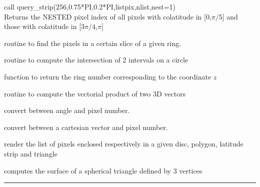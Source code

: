 \begin{example}
{
call query\_strip(256,0.75*PI,0.2*PI,listpix,nlist,nest=1)  \\
}
{
Returns the NESTED pixel index of all pixels with colatitude in
[0,$\pi/5$] and those with colatitude in [$3\pi/4$,$\pi$]
}
\end{example}
\begin{modules}
  \begin{sulist}{} %
 \item[\htmlref{in\_ring}{sub:in_ring}] routine to find the pixels in a certain slice of a given ring.		
 \item[intrs\_intrv] routine to compute the intersection of 2 intervals on a circle
 \item[\htmlref{ring\_num}{sub:ring_num}] function to return the ring number corresponding to the coordinate $z$
 \item[\htmlref{vect\_prod}{sub:vect_prod}] routine to compute the vectorial product of two 3D vectors
  \end{sulist}
\end{modules}

\begin{related}
  \begin{sulist}{} %
  \item[\htmlref{pix2ang}{sub:pix_tools}, \htmlref{ang2pix}{sub:pix_tools}] convert between angle and pixel number.
  \item[\htmlref{pix2vec}{sub:pix_tools}, \htmlref{vec2pix}{sub:pix_tools}] convert between a cartesian vector and pixel number.
  \item[\htmlref{query\_disc}{sub:query_disc}, \htmlref{query\_polygon}{sub:query_polygon},]
  \item[query\_strip, \htmlref{query\_triangle}{sub:query_triangle}] render the list of pixels enclosed
  respectively in a given disc, polygon, latitude strip and triangle
  \item[\htmlref{surface\_triangle}{sub:surface_triangle}] computes the surface of a spherical triangle defined by 3 vertices

  \end{sulist}
\end{related}

\rule{\hsize}{2mm}

\newpage
